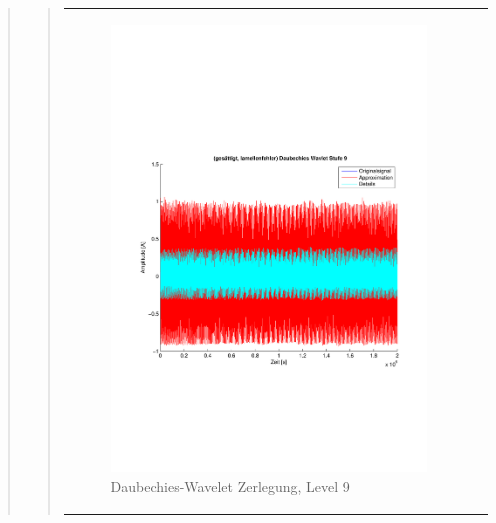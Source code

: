 \begin{quote}
\begin{quote}
\begin{center}
\begin{tabular}{ll}
\begin{minipage}{0.6\textwidth}
                    \end{minipage}
                    \begin{minipage}{0.6\textwidth}
    
                        \begin{figure}[H]
                            \label{fig:}
                            \includegraphics[scale=0.4, trim = 2cm 6cm 1cm
                            7.5cm,
                            clip]{./Bilder/Termin8/lamellenfehler_gesaettigt_Daubechies_Wavlet_lvl_9}
                            \caption{Daubechies-Wavelet Zerlegung, Level 9}
                        \end{figure}
                    \vspace{-1.5em}
    

\end{minipage}
\end{tabular}
\end{center}
\end{quote}
\end{quote}

